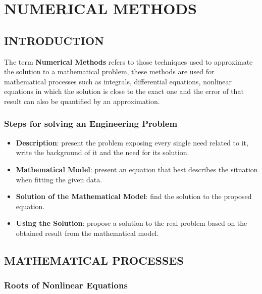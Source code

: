 \documentclass[12pt]{report}
\begin{document}

\part{NUMERICAL METHODS}

\chapter{INTRODUCTION}

\par The term \textbf{Numerical Methods} refers to those techniques used to approximate the solution to a mathematical problem, these methods are used for mathematical processes such as integrals, differential equations, nonlinear equations in which the solution is close to the exact one and the error of that result can also be quantified by an approximation.

\section{Steps for solving an Engineering Problem}

\begin{itemize}
\item \textbf{Description}: present the problem exposing every single need related to it, write the background of it and the need for its solution.
\item \textbf{Mathematical Model}: present an equation that best describes the situation when fitting the given data.
\item \textbf{Solution of the Mathematical Model}: find the solution to the proposed equation.
\item \textbf{Using the Solution}: propose a solution to the real problem based on the obtained result from the mathematical model.
\end{itemize}

\chapter{MATHEMATICAL PROCESSES}

\section{Roots of Nonlinear Equations}
\end{document}
